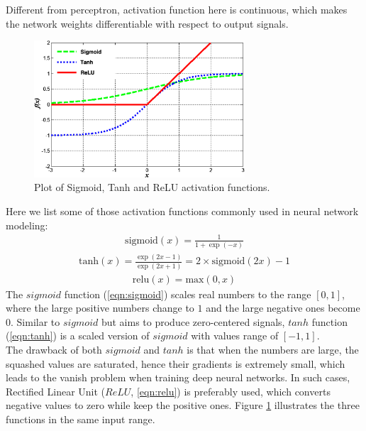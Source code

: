 Different from perceptron, activation function here is continuous, which makes the network weights differentiable with respect to output signals. \\
\begin{figure}[h]
    \centering
    \includegraphics[width=0.7\textwidth]{resources/images/activation.png}
    \caption{Plot of Sigmoid, Tanh and ReLU activation functions.}
    \label{fig:activation}
\end{figure}
Here we list some of those activation functions commonly used in neural network modeling:
\begin{align} \label{eqn:sigmoid}
    \mathrm{sigmoid}(x) = \frac{1}{1 + \exp(-x)}
\end{align}
\begin{align} \label{eqn:tanh}
    \mathrm{tanh}(x) = \frac{\exp(2x - 1)}{\exp(2x + 1)} = 2 \times \mathrm{sigmoid}(2x) - 1
\end{align}
\begin{align} \label{eqn:relu}
    \mathrm{relu}(x) = \mathrm{max}(0, x)
\end{align}
The $sigmoid$ function (\ref{eqn:sigmoid}) scales real numbers to the range $[0, 1]$, where the large positive numbers change to $1$ and the large negative ones become $0$. Similar to $sigmoid$ but aims to produce zero-centered signals, $tanh$ function (\ref{eqn:tanh}) is a scaled version of $sigmoid$ with values range of $[-1, 1]$.\\
The drawback of both $sigmoid$ and $tanh$ is that when the numbers are large, the squashed values are saturated, hence their gradients is extremely small, which leads to the vanish problem when training deep neural networks. In such cases, Rectified Linear Unit ($ReLU$, \ref{eqn:relu}) is preferably used, which converts negative values to zero while keep the positive ones.
Figure \ref{fig:activation} illustrates the three functions in the same input range.



